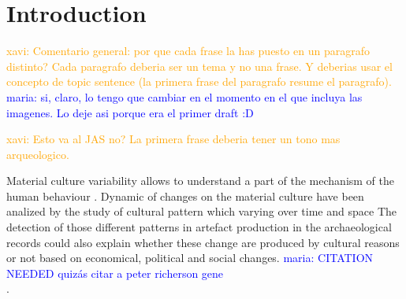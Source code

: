 \documentclass[review]{elsarticle}
\newcommand{\memo}[2]{\textcolor{#1}{#2}}
\newcommand{\xavi}[1]{\memo{orange}{xavi: #1\\}}
\newcommand{\maria}[1]{\memo{blue}{maria: #1\\}}
\begin{document}



\section{Introduction}

\xavi{Comentario general: por que cada frase la has puesto en un paragrafo distinto? Cada paragrafo deberia ser un tema y no una frase. Y deberias usar el concepto de topic sentence (la primera frase del paragrafo resume el paragrafo).}
\maria{si, claro, lo tengo que cambiar en el momento en el que incluya las imagenes. Lo deje asi porque era el primer draft :D}


\xavi{Esto va al JAS no? La primera frase deberia tener un tono mas arqueologico.}

  

Material culture variability allows to understand a part of the mechanism of the human behaviour \citep{basalla1988evolution, schillinger_copying_2016}. Dynamic of changes on the material culture have been analized by the study of cultural pattern which varying over time and space \citep{eerkens_jelmer_cultural_2007, lycett_cultural_2015} The detection of those  different patterns in artefact production in the archaeological records could also explain whether these change are produced by cultural reasons or not based on economical, political and social changes. \maria{CITATION NEEDED quizás citar a peter richerson gene}. 
\end{document}
